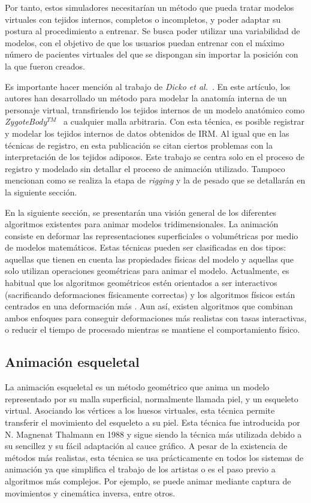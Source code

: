Por tanto, estos simuladores necesitarían un método que pueda tratar modelos virtuales con tejidos internos, completos o incompletos, y poder adaptar su postura al procedimiento a entrenar. Se busca poder utilizar una variabilidad de modelos, con el objetivo de que los usuarios puedan entrenar con el máximo número de pacientes virtuales del que se dispongan sin importar la posición con la que fueron creados.

Es importante hacer mención al trabajo de  \emph{Dicko et al.}~\cite{Ali2013}.  En este artículo, los autores han desarrollado un método para modelar la anatomía interna de un personaje virtual, transfiriendo los tejidos internos de un modelo anatómico como \emph{ZygoteBody}$^{TM}$~\cite{kelc2012zygote} a cualquier malla arbitraria. Con esta técnica, es posible registrar y modelar los tejidos internos de datos obtenidos de \ac{IRM}. Al igual que en las técnicas de registro, en esta publicación se citan ciertos problemas con la interpretación de los tejidos adiposos. Este trabajo se centra solo en el proceso de registro y modelado sin detallar el proceso de animación utilizado. Tampoco mencionan como se realiza la etapa de \emph{rigging} y la de pesado que se detallarán en la siguiente sección.  


En la siguiente sección, se presentarán una visión general de los diferentes algoritmos existentes para animar modelos tridimensionales. La animación consiste en deformar las representaciones superficiales  o volumétricas por medio de modelos matemáticos. Estas técnicas pueden ser clasificadas en dos tipos: aquellas que tienen en cuenta las propiedades físicas del modelo y aquellas que solo utilizan operaciones geométricas para animar el modelo. Actualmente, es habitual que los algoritmos geométricos estén orientados a ser interactivos (sacrificando deformaciones físicamente correctas) y  los algoritmos físicos están centrados en una deformación más  . Aun así, existen algoritmos que combinan ambos enfoques para conseguir deformaciones más realistas con tasas interactivas, o reducir el tiempo de procesado mientras se mantiene el comportamiento físico. 


\subsection{Animación esqueletal}
\label{art:animation}
\label{art:virtualskel}

La animación esqueletal es un método geométrico que anima un modelo representado por su malla superficial, normalmente llamada piel, y un esqueleto virtual. Asociando los vértices a los huesos virtuales, esta técnica permite transferir el movimiento del esqueleto a su piel. Esta técnica fue introducida por N. Magnenat Thalmann en 1988 \cite{thalmann88} y sigue siendo la técnica más utilizada debido a su sencillez y su fácil adaptación al cauce gráfico. A pesar de la existencia de métodos más realistas, esta técnica se usa prácticamente en todos los sistemas de animación ya que simplifica el trabajo de los artistas o es el paso previo a algoritmos más complejos. Por ejemplo, se puede animar mediante captura de movimientos y cinemática inversa, entre otros.

